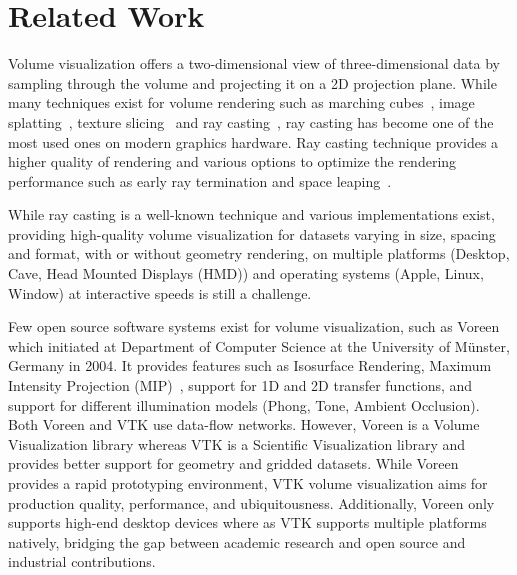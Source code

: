 \section{Related Work}
\label{relatedwork}

Volume visualization offers a two-dimensional view of three-dimensional data by
sampling through the volume and projecting it on a 2D projection plane.  While
many techniques exist for volume rendering such as marching
cubes~\citep{lorensen_marching_1987}, image
splatting~\citep{westover_footprint_1990}, texture
slicing~\citep{rezk-salama_interactive_2000, engel_high-quality_2001} and ray
casting~\citep{hsu_segmented_1993, ma_parallel_1995, ma_scalable_1997,
heng_gpu-based_2005}, ray casting has become one of the most used ones on modern
graphics hardware. Ray casting technique provides a higher quality of rendering
and various options to optimize the rendering performance such as early ray
termination and space leaping~\citep{yagel_accelerating_1993}.

While ray casting is a well-known technique and various implementations exist,
providing high-quality volume visualization for datasets
varying in size, spacing and format, with or without geometry rendering, on
multiple platforms (Desktop, Cave, Head Mounted Displays (HMD)) and operating
systems (Apple, Linux, Window) at interactive speeds is still a challenge.

Few open source software systems exist for volume visualization, such as
Voreen~\citep{meyer-spradow_voreen:_2009} which initiated at Department of
Computer Science at the University of M\"unster, Germany in 2004.  It provides
features such as Isosurface Rendering, Maximum Intensity Projection
(MIP)~\citep{wallis_three-dimensional_1989}, support for 1D and 2D transfer
functions, and support for different illumination models (Phong, Tone, Ambient
Occlusion). Both Voreen and VTK use data-flow networks. However, Voreen is a
Volume Visualization library whereas VTK is a Scientific Visualization library
and provides better support for geometry and gridded datasets. While Voreen
provides a rapid prototyping environment, VTK volume visualization aims for
production quality, performance, and ubiquitousness. Additionally, Voreen only
supports high-end desktop devices where as VTK supports multiple platforms
natively, bridging the gap between academic research and open source and
industrial contributions.

